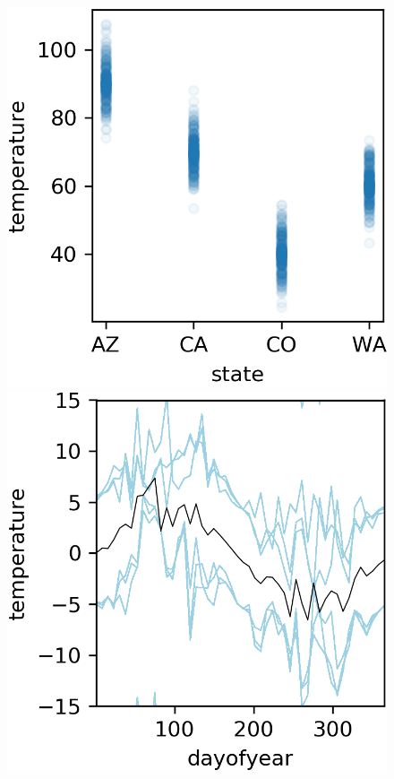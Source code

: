 \documentclass[12pt]{article}
\begin{document}
\begin{figure}[htbp]
\begin{center}
\includegraphics[scale=0.7]{images/state_vs_temp.png}
\includegraphics[scale=0.7]{images/dayofyear_vs_temp_pdp.png}

\end{center}
\end{figure}
\end{document}

